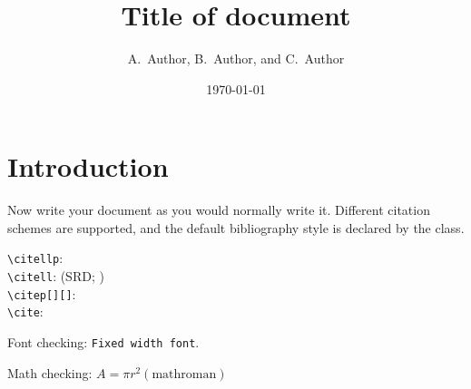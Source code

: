 \documentclass[DM,lsstdraft,toc]{lsstdoc}
\title[Short title]{Title of document}
\author{
A.~Author,
B.~Author,
and
C.~Author}
\date{\today}
\begin{document}
\maketitle

\section{Introduction}

Now write your document as you would normally write it.
Different citation schemes are supported, and the default bibliography style is declared by the class.

\verb|\citellp|:  \\
\verb|\citell|: (SRD; ) \\
\verb|\citep[][]|: \citep[e.g.,][are interesting]{LPM-17,LSE-29} \\
\verb|\cite|: \cite{LPM-17,LSE-29}

Font checking: \texttt{Fixed width font}.

Math checking: $A = \pi r^2 \mathrm{(math roman)}$


\end{document}

